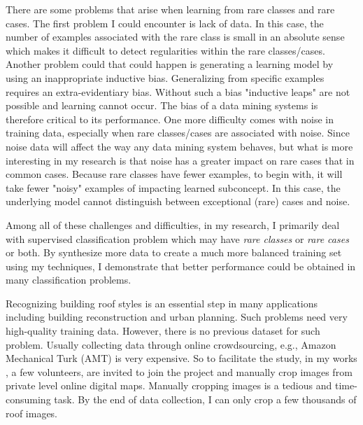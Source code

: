 \documentclass{iitthesis}
\begin{document}
There are some problems that arise when learning from rare classes and rare cases. The first problem I could encounter is lack of data. In this case, the number of examples associated with the rare class is small in an absolute sense which makes it difficult to detect regularities within the rare classes/cases. Another problem could that could happen is generating a learning model by using an inappropriate inductive bias. Generalizing from specific examples requires an extra-evidentiary bias. Without such a bias "inductive leaps" are not possible and learning cannot occur. The bias of a data mining systems is therefore critical to its performance. One more difficulty comes with noise in training data, especially when rare classes/cases are associated with noise. Since noise data will affect the way any data mining system behaves, but what is more interesting in my research is that noise has a greater impact on rare cases that in common cases. Because rare classes have fewer examples, to begin with, it will take fewer "noisy" examples of impacting learned subconcept. In this case, the underlying model cannot distinguish between exceptional (rare) cases and noise.

Among all of these challenges and difficulties, in my research, I primarily deal with supervised classification problem which may have \textit{rare classes} or \textit{rare cases} or both. By synthesize more data to create a much more balanced training set using my techniques, I demonstrate that better performance could be obtained in many classification problems.

 Recognizing building roof styles is an essential step in many applications including building reconstruction and urban planning. Such problems need very high-quality training data. However, there is no previous dataset for such problem. Usually collecting data through online crowdsourcing, e.g., Amazon Mechanical Turk (AMT) is very expensive. So to facilitate the study, in my works \cite{AndiZang2015}\cite{Zhang2014Autoencoder}, a few volunteers, are invited to join the project and manually crop images from private level online digital maps. Manually cropping images is a tedious and time-consuming task. By the end of data collection, I can only crop a few thousands of roof images. 
\end{document}
